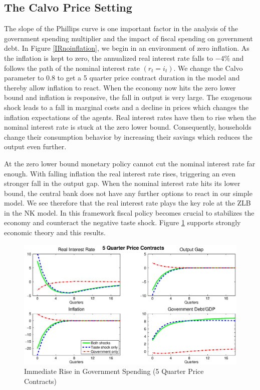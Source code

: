\documentclass[12pt,a4paper,oneside,titlepage]{article}
\begin{document}
\subsection*{The Calvo Price Setting}
The slope of the Phillips curve is one important factor in the analysis of the government spending multiplier and the impact of fiscal spending on government debt. In Figure \ref{IRnoinflation}, we begin in an environment of zero inflation.
As the inflation is kept to zero, the annualized real interest rate falls to $-4\%$ and follows the path of the nominal interest rate $\left(r_t = i_t\right)$. We change the Calvo parameter to 0.8 to get a 5 quarter price contract duration in the model and thereby allow inflation to react. When the economy now hits the zero lower bound and inflation is responsive, the fall in output is very large. The exogenous shock leads to a fall in marginal costs and a decline in prices which changes the inflation expectations of the agents. Real interest rates have then to rise when the nominal interest rate is stuck at the zero lower bound. Consequently, households change their consumption behavior by increasing their savings which reduces the output even further.
\par
\bigskip
At the zero lower bound monetary policy cannot cut the nominal interest rate far enough. With falling inflation the real interest rate rises, triggering an even stronger fall in the output gap. When the nominal interest rate hits its lower bound, the central bank does not have any further options to react in our simple model. We see therefore that the real interest rate plays the key role at the ZLB in the NK model. In this framework fiscal policy becomes crucial to stabilizes the economy and counteract the negative taste shock. Figure \ref{IR5quarter} supports strongly economic theory and this results.

\begin{figure}[p]
\includegraphics[width=\textwidth]{Paperpics/Figure25quarter}
\caption{Immediate Rise in Government Spending (5 Quarter Price Contracts)}
\label{IR5quarter}
\end{figure}
\end{document}

